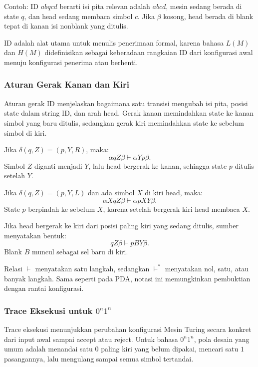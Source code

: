 Contoh: ID $abqcd$ berarti isi pita relevan adalah $abcd$, mesin sedang berada di state $q$, dan head sedang membaca simbol $c$. Jika $\beta$ kosong, head berada di blank tepat di kanan isi nonblank yang ditulis.

ID adalah alat utama untuk menulis penerimaan formal, karena bahasa $L(M)$ dan $H(M)$ didefinisikan sebagai keberadaan rangkaian ID dari konfigurasi awal menuju konfigurasi penerima atau berhenti.

\subsubsection{Aturan Gerak Kanan dan Kiri}

\begin{jawab}
Aturan gerak ID menjelaskan bagaimana satu transisi mengubah isi pita, posisi state dalam string ID, dan arah head. Gerak kanan memindahkan state ke kanan simbol yang baru ditulis, sedangkan gerak kiri memindahkan state ke sebelum simbol di kiri.
\end{jawab}

Jika $\delta(q,Z)=(p,Y,R)$, maka:
\[
    \alpha qZ\beta \vdash \alpha Yp\beta.
\]
Simbol $Z$ diganti menjadi $Y$, lalu head bergerak ke kanan, sehingga state $p$ ditulis setelah $Y$.

Jika $\delta(q,Z)=(p,Y,L)$ dan ada simbol $X$ di kiri head, maka:
\[
    \alpha XqZ\beta \vdash \alpha pXY\beta.
\]
State $p$ berpindah ke sebelum $X$, karena setelah bergerak kiri head membaca $X$.

Jika head bergerak ke kiri dari posisi paling kiri yang sedang ditulis, sumber menyatakan bentuk:
\[
    qZ\beta \vdash pBY\beta.
\]
Blank $B$ muncul sebagai sel baru di kiri.

Relasi $\vdash$ menyatakan satu langkah, sedangkan $\vdash^*$ menyatakan nol, satu, atau banyak langkah. Sama seperti pada PDA, notasi ini memungkinkan pembuktian dengan rantai konfigurasi.

\subsubsection{\texorpdfstring{Trace Eksekusi untuk $0^n1^n$}{Trace Eksekusi untuk 0n1n}}

\begin{jawab}
Trace eksekusi menunjukkan perubahan konfigurasi Mesin Turing secara konkret dari input awal sampai accept atau reject. Untuk bahasa $0^n1^n$, pola desain yang umum adalah menandai satu $0$ paling kiri yang belum dipakai, mencari satu $1$ pasangannya, lalu mengulang sampai semua simbol tertandai.
\end{jawab}

